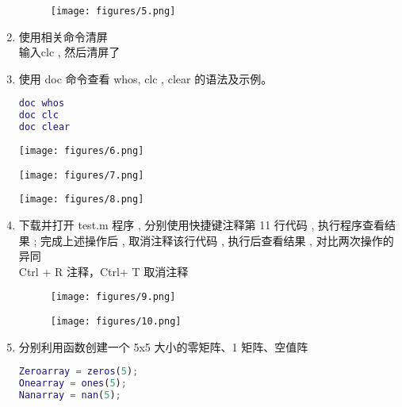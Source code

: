 \documentclass{rsreport}
\begin{document}
\begin{enumerate}
        \begin{figure}[htp]
            \centering
                \texttt{[image: figures/5.png]}
            \end{figure}
        \item 使用相关命令清屏 \\
        \textcolor[rgb]{0,0,1}{输入clc , 然后清屏了}
        \item 使用 doc 命令查看 whos, clc , clear 的语法及示例。\\
        
        \begin{lstlisting}[language=matlab]
doc whos
doc clc
doc clear
        \end{lstlisting}
        
        \begin{minipage}[b]{0.31\textwidth}
            \texttt{[image: figures/6.png]}
        \end{minipage}
        \begin{minipage}[b]{0.31\textwidth}
            \texttt{[image: figures/7.png]}
        \end{minipage}
        \begin{minipage}[b]{0.31\textwidth}
            \texttt{[image: figures/8.png]}
        \end{minipage}
        \item 下载并打开 test.m 程序 , 分别使用快捷键注释第 11 行代码 , 执行程序查看结果 ; 完成上述操作后 , 取消注释该行代码 , 执行后查看结果 , 对比两次操作的异同\\
        \textcolor[rgb]{0,0,1}{Ctrl + R 注释，Ctrl+ T 取消注释}
        \begin{figure}[htp]
            \begin{minipage}[b]{0.45\textwidth}
                \texttt{[image: figures/9.png]}
            \end{minipage}
            \begin{minipage}[b]{0.45\textwidth}
                \texttt{[image: figures/10.png]}
            \end{minipage}
        \end{figure}
        \item 分别利用函数创建一个 5x5 大小的零矩阵、1 矩阵、空值阵\\
        
        \begin{lstlisting}[language=matlab]
Zeroarray = zeros(5);
Onearray = ones(5);
Nanarray = nan(5);
        \end{lstlisting}
         

\end{enumerate}
\end{document}
